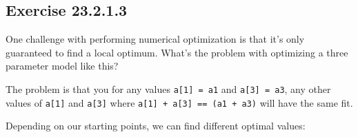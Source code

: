 \documentclass[]{book}
\newenvironment{Shaded}{\begin{snugshade}}{\end{snugshade}}
\newcommand{\CommentTok}[1]{\textcolor[rgb]{0.56,0.35,0.01}{\textit{#1}}}
\newcommand{\ControlFlowTok}[1]{\textcolor[rgb]{0.13,0.29,0.53}{\textbf{#1}}}
\newcommand{\DataTypeTok}[1]{\textcolor[rgb]{0.13,0.29,0.53}{#1}}
\newcommand{\DecValTok}[1]{\textcolor[rgb]{0.00,0.00,0.81}{#1}}
\newcommand{\KeywordTok}[1]{\textcolor[rgb]{0.13,0.29,0.53}{\textbf{#1}}}
\newcommand{\NormalTok}[1]{#1}
\newcommand{\OperatorTok}[1]{\textcolor[rgb]{0.81,0.36,0.00}{\textbf{#1}}}
\newcommand{\StringTok}[1]{\textcolor[rgb]{0.31,0.60,0.02}{#1}}
\theoremstyle{plain}
\theoremstyle{remark}
\begin{document}
\hypertarget{exercise-23.2.1.3}{%
\subsection*{\texorpdfstring{Exercise {23.2.1.3}}{Exercise 23.2.1.3}}\label{exercise-23.2.1.3}}

One challenge with performing numerical optimization is that it's only guaranteed to find a local optimum. What's the problem with optimizing a three parameter model like this?

\begin{Shaded}
\end{Shaded}

The problem is that you for any values \texttt{a{[}1{]}\ =\ a1} and \texttt{a{[}3{]}\ =\ a3}, any other values of \texttt{a{[}1{]}} and \texttt{a{[}3{]}} where \texttt{a{[}1{]}\ +\ a{[}3{]}\ ==\ (a1\ +\ a3)} will have the same fit.

\begin{Shaded}
\end{Shaded}

Depending on our starting points, we can find different optimal values:

\begin{Shaded}
\end{Shaded}
\end{document}
